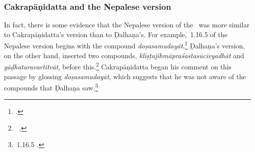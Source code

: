 


 
\subsubsection{Cakrapāṇidatta and the Nepalese version}
In fact, there is some evidence that the Nepalese version of the \SS\ was more
similar to Cakrapāṇidatta's version than to Ḍalhaṇa's. For example, \SS\,1.16.5 of
the Nepalese version begins with the compound
\emph{doṣasamudayāt}.\footcite[126]{acar-1939} Ḍalhaṇa's version, on the other
hand,  inserted two compounds, \emph{kliṣṭajihmāpraśastasūcīvyadhāt} and
\emph{gāḍhataravartitvāt}, before this.\footnote{\SS\ .} Cakrapāṇidatta
began his comment on this passage by glossing \emph{doṣasamudayāt}, which
suggests that he was not aware of the compounds that Ḍalhaṇa
saw.\footnote{\SS\,1.16.5 \citep[126–127]{acar-1939}.}

